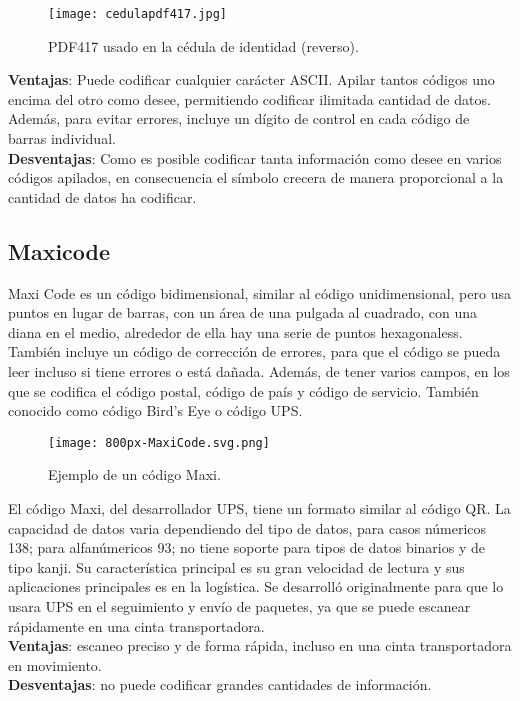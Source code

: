 \begin{figure} 
	\centering
	\texttt{[image: cedulapdf417.jpg]}
	\caption{PDF417 usado en la cédula de identidad (reverso).}
	\label{fig:pdf417CI}
\end{figure} 
\textbf{Ventajas}: Puede codificar cualquier carácter ASCII. Apilar tantos códigos uno encima del otro como desee, permitiendo codificar ilimitada cantidad de datos. Además, para evitar errores, incluye un dígito de control en cada código de barras individual.\cite{cognex.com2021}
\\
\textbf{Desventajas}: Como es posible codificar tanta información como desee en varios códigos apilados, en consecuencia el símbolo crecera de manera proporcional a la cantidad de datos ha codificar.\cite{cognex.com2021}

\subsection{Maxicode}

Maxi Code es un código bidimensional, similar al código unidimensional, pero usa puntos en lugar de barras, con un área de una pulgada al cuadrado, con una diana en el medio, alrededor de ella hay una serie de puntos hexagonaless. También incluye un código de corrección de errores, para que el código se pueda leer incluso si tiene errores o está dañada. Además, de tener varios campos, en los que se codifica el código postal, código de país y código de servicio. También conocido como código Bird's Eye o código UPS.\cite{cognex.com2021}

\begin{figure} 
	\centering
	\texttt{[image: 800px-MaxiCode.svg.png]}
	\caption{Ejemplo de un código Maxi.}
	\label{fig:maxicode}
\end{figure} 

El código Maxi, del desarrollador UPS, tiene un formato similar al código QR. La capacidad de datos varia dependiendo del tipo de datos, para casos númericos 138; para alfanúmericos 93; no tiene soporte para tipos de datos binarios y de tipo kanji. Su característica principal es su gran velocidad de lectura y sus aplicaciones principales es en la logística. Se desarrolló originalmente para que lo usara UPS en el seguimiento y envío de paquetes, ya que se puede escanear rápidamente en una cinta transportadora.\cite{2012_DENSO}
\\
\textbf{Ventajas}: escaneo preciso y de forma rápida, incluso en una cinta transportadora en movimiento. \cite{cognex.com2021}
\\
\textbf{Desventajas}: no puede codificar grandes cantidades de información.\cite{cognex.com2021}

